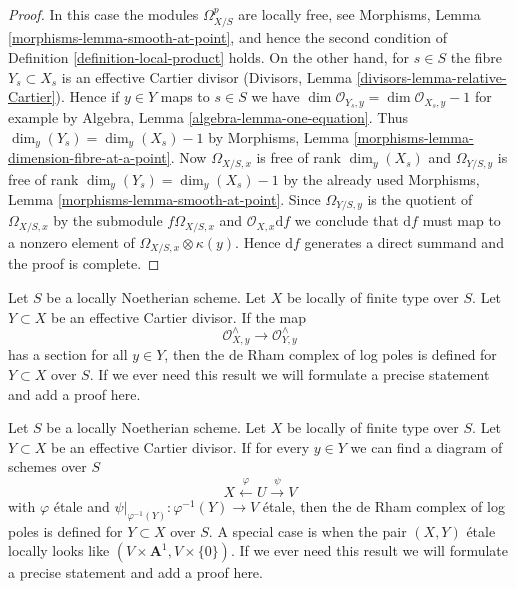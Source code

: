 \begin{proof}
In this case the modules $\Omega^p_{X/S}$ are locally free, see
Morphisms, Lemma \ref{morphisms-lemma-smooth-at-point}, and hence the second
condition of Definition \ref{definition-local-product} holds.
On the other hand, for $s \in S$ the fibre $Y_s \subset X_s$ is
an effective Cartier divisor
(Divisors, Lemma \ref{divisors-lemma-relative-Cartier}).
Hence if $y \in Y$ maps to $s \in S$ we have
$\dim \mathcal{O}_{Y_s, y} = \dim \mathcal{O}_{X_s, y} - 1$
for example by Algebra, Lemma \ref{algebra-lemma-one-equation}.
Thus $\dim_y(Y_s) = \dim_y(X_s) - 1$ by
Morphisms, Lemma \ref{morphisms-lemma-dimension-fibre-at-a-point}.
Now $\Omega_{X/S, x}$ is free of rank $\dim_y(X_s)$
and $\Omega_{Y/S, y}$ is free of rank $\dim_y(Y_s) = \dim_y(X_s) - 1$ by
the already used Morphisms, Lemma \ref{morphisms-lemma-smooth-at-point}.
Since $\Omega_{Y/S, y}$ is the quotient of
$\Omega_{X/S, x}$ by the submodule $f\Omega_{X/S, x}$ and
$\mathcal{O}_{X, x}\text{d}f$ we conclude that $\text{d}f$
must map to a nonzero element of $\Omega_{X/S, x} \otimes \kappa(y)$.
Hence $\text{d}f$ generates a direct summand and the proof is complete.
\end{proof}

\begin{remark}
\label{remark-check-log-completion-1}
Let $S$ be a locally Noetherian scheme. Let $X$ be locally of finite
type over $S$. Let $Y \subset X$ be an effective Cartier divisor.
If the map
$$
\mathcal{O}_{X, y}^\wedge \longrightarrow \mathcal{O}_{Y, y}^\wedge
$$
has a section for all $y \in Y$, then
the de Rham complex of log poles is defined for $Y \subset X$ over $S$.
If we ever need this result we will formulate a precise statement and
add a proof here.
\end{remark}

\begin{remark}
\label{remark-check-log-completion-2}
Let $S$ be a locally Noetherian scheme. Let $X$ be locally of finite
type over $S$. Let $Y \subset X$ be an effective Cartier divisor.
If for every $y \in Y$ we can find a diagram of schemes over $S$
$$
X \xleftarrow{\varphi} U \xrightarrow{\psi} V
$$
with $\varphi$ \'etale and $\psi|_{\varphi^{-1}(Y)} : \varphi^{-1}(Y) \to V$
\'etale, then the de Rham complex of log poles is defined for
$Y \subset X$ over $S$. A special case is when the pair $(X, Y)$
\'etale locally looks like $(V \times \mathbf{A}^1, V \times \{0\})$.
If we ever need this result we will formulate
a precise statement and add a proof here.
\end{remark}
































